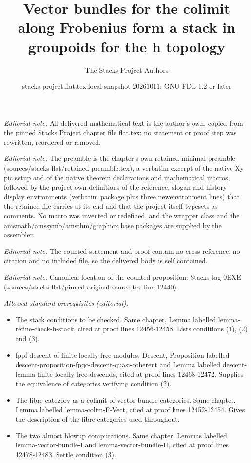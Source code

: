 \documentclass[10pt,a4paper]{amsart}
\title{Vector bundles for the colimit along Frobenius form a stack in groupoids for the h topology}
\author{The Stacks Project Authors}
\date{stacks-project:flat.tex:local-snapshot-20261011; GNU FDL 1.2 or later}
\theoremstyle{plain}
\theoremstyle{definition}
\theoremstyle{remark}
\numberwithin{equation}{subsection}
\begin{document}
\maketitle
\noindent\textit{Editorial note.} All delivered mathematical text is the author's own, copied from the pinned Stacks Project chapter file flat.tex; no statement or proof step was rewritten, reordered or removed.\par\medskip
\noindent\textit{Editorial note.} The preamble is the chapter's own retained minimal preamble (sources/stacks-flat/retained-preamble.tex), a verbatim excerpt of the native Xy-pic setup and of the native theorem declarations and mathematical macros, followed by the project own definitions of the reference, slogan and history display environments (verbatim package plus three newenvironment lines) that the retained file carries at its end and that the project itself typesets as comments. No macro was invented or redefined, and the wrapper class and the amsmath/amssymb/amsthm/graphicx base packages are supplied by the assembler.\par\medskip
\noindent\textit{Editorial note.} The counted statement and proof contain no cross reference, no citation and no included file, so the delivered body is self contained.\par\medskip
\noindent\textit{Editorial note.} Canonical location of the counted proposition: Stacks tag 0EXE (sources/stacks-flat/pinned-original-source.tex line 12440).\par\medskip
\noindent\textit{Allowed standard prerequisites (editorial).}\begin{itemize}
\item The stack conditions to be checked. Same chapter, Lemma labelled lemma-refine-check-h-stack, cited at proof lines 12456-12458. Lists conditions (1), (2) and (3).
\item fppf descent of finite locally free modules. Descent, Proposition labelled descent-proposition-fpqc-descent-quasi-coherent and Lemma labelled descent-lemma-finite-locally-free-descends, cited at proof lines 12468-12472. Supplies the equivalence of categories verifying condition (2).
\item The fibre category as a colimit of vector bundle categories. Same chapter, Lemma labelled lemma-colim-F-Vect, cited at proof lines 12452-12454. Gives the description of the fibre categories used throughout.
\item The two almost blowup computations. Same chapter, Lemmas labelled lemma-vector-bundle-I and lemma-vector-bundle-II, cited at proof lines 12478-12483. Settle condition (3).
\end{itemize}\medskip
\end{document}
